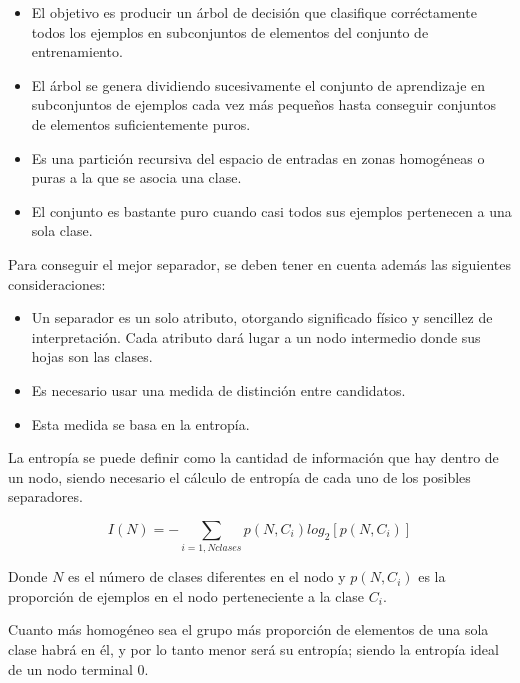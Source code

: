 \documentclass[a4paper, 11pt, titlepage]{article}
\begin{document}
            \begin{itemize}
                \item El objetivo es producir un árbol de decisión que clasifique corréctamente 
                todos los ejemplos en subconjuntos de elementos del conjunto de entrenamiento.
                \item El árbol se genera dividiendo sucesivamente el conjunto de aprendizaje en 
                subconjuntos de ejemplos cada vez más pequeños hasta conseguir conjuntos de elementos 
                suficientemente puros.
                \item Es una partición recursiva del espacio de entradas en zonas homogéneas o puras 
                a la que se asocia una clase.
                \item El conjunto es bastante puro cuando casi todos sus ejemplos pertenecen a una sola
                clase.
            \end{itemize}

            Para conseguir el mejor separador, se deben tener en cuenta además las siguientes 
            consideraciones:

            \begin{itemize}
                \item Un separador es un solo atributo, otorgando significado físico y sencillez 
                de interpretación. Cada atributo dará lugar a un nodo intermedio donde sus hojas 
                son las clases.
                \item Es necesario usar una medida de distinción entre candidatos. 
                \item Esta medida se basa en la entropía.
            \end{itemize}

            La entropía se puede definir como la cantidad de información que hay dentro de un nodo, 
            siendo necesario el cálculo de entropía de cada uno de los posibles separadores.

            \[I(N)=-\displaystyle\sum_{i=1,Nclases} p(N,C_i) log_2 [p(N,C_i)]\]

            Donde $N$ es el número de clases diferentes en el nodo y $p(N, C_i)$ es la proporción 
            de ejemplos en el nodo perteneciente a la clase $C_i$.

            Cuanto más homogéneo sea el grupo más proporción de elementos de una sola clase habrá en él, 
            y por lo tanto menor será su entropía; siendo la entropía ideal de un nodo terminal 0.
\end{document}
